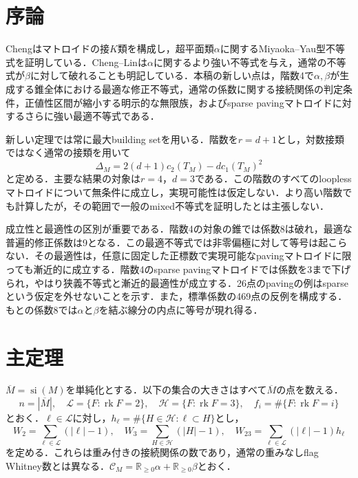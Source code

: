 \documentclass[12pt]{amsart}
\theoremstyle{definition}
\theoremstyle{remark}
\numberwithin{equation}{section}
\newcommand{\rk}{\operatorname{rk}}
\newcommand{\R}{\mathbb{R}}
\begin{document}
\section{序論}
Chengはマトロイドの接$K$類を構成し，超平面類$\alpha$に関するMiyaoka--Yau型不等式を証明している．Cheng--Linは$\alpha$に関するより強い不等式を与え，通常の不等式が$\beta$に対して破れることも明記している\cite{Che,CL,CheG}．本稿の新しい点は，階数4で$\alpha,\beta$が生成する錐全体における最適な修正不等式，通常の係数に関する接続関係の判定条件，正値性区間が縮小する明示的な無限族，およびsparse pavingマトロイドに対するさらに強い最適不等式である．

新しい定理では常に最大building setを用いる．階数を$r=d+1$とし，対数接類ではなく通常の接類を用いて
\[
 \Delta_M=2(d+1)c_2(T_M)-d c_1(T_M)^2
\]
と定める．主要な結果の対象は$r=4$，$d=3$である．この階数のすべてのlooplessマトロイドについて無条件に成立し，実現可能性は仮定しない．より高い階数でも計算したが，その範囲で一般のmixed不等式を証明したとは主張しない．

成立性と最適性の区別が重要である．階数4の対象の錐では係数8は破れ，最適な普遍的修正係数は9となる．この最適不等式では非零偏極に対して等号は起こらない．その最適性は，任意に固定した正標数で実現可能なpavingマトロイドに限っても漸近的に成立する．階数4のsparse pavingマトロイドでは係数を3まで下げられ，やはり狭義不等式と漸近的最適性が成立する．26点のpavingの例はsparseという仮定を外せないことを示す．また，標準係数の469点の反例を構成する．もとの係数8では$\alpha$と$\beta$を結ぶ線分の内点に等号が現れ得る．

\section{主定理}
$\overline M=\operatorname{si}(M)$を単純化とする．以下の集合の大きさはすべて$\overline M$の点を数える．
\[
 n=|\overline M|,\quad \mathscr L=\{F:\rk F=2\},\quad
 \mathscr H=\{F:\rk F=3\},\quad f_i=\#\{F:\rk F=i\}
\]
とおく．$\ell\in\mathscr L$に対し，$h_\ell=\#\{H\in\mathscr H:\ell\subset H\}$とし，
\begin{equation}\label{ja-weights}
 W_2=\sum_{\ell\in\mathscr L}(|\ell|-1),\quad
 W_3=\sum_{H\in\mathscr H}(|H|-1),\quad
 W_{23}=\sum_{\ell\in\mathscr L}(|\ell|-1)h_\ell
\end{equation}
を定める．これらは重み付きの接続関係の数であり，通常の重みなしflag Whitney数とは異なる．$\mathscr C_M=\R_{\geq0}\alpha+\R_{\geq0}\beta$とおく．
\end{document}
